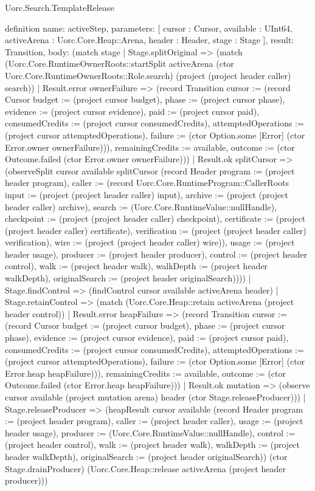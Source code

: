 \begin{lexlean}{Uorc.Search.TemplateRelease}
\begin{semanticmodule}
definition{
  name: activeStep,
  parameters: [
    cursor : Cursor,
    available : UInt64,
    activeArena : Uorc.Core.Heap::Arena,
    header : Header,
    stage : Stage
  ],
  result: Transition,
  body: (match stage
    | Stage.splitOriginal => (match (Uorc.Core.RuntimeOwnerRoots::startSplit activeArena (ctor Uorc.Core.RuntimeOwnerRoots::Role.search) (project (project header caller) search))
      | Result.error ownerFailure => (record Transition {cursor := (record Cursor {budget := (project cursor budget), phase := (project cursor phase), evidence := (project cursor evidence), paid := (project cursor paid), consumedCredits := (project cursor consumedCredits), attemptedOperations := (project cursor attemptedOperations), failure := (ctor Option.some [Error] (ctor Error.owner ownerFailure))}), remainingCredits := available, outcome := (ctor Outcome.failed (ctor Error.owner ownerFailure))})
      | Result.ok splitCursor => (observeSplit cursor available splitCursor (record Header {program := (project header program), caller := (record Uorc.Core.RuntimeProgram::CallerRoots {input := (project (project header caller) input), archive := (project (project header caller) archive), search := (Uorc.Core.RuntimeValue::nullHandle), checkpoint := (project (project header caller) checkpoint), certificate := (project (project header caller) certificate), verification := (project (project header caller) verification), wire := (project (project header caller) wire)}), usage := (project header usage), producer := (project header producer), control := (project header control), walk := (project header walk), walkDepth := (project header walkDepth), originalSearch := (project header originalSearch)})))
    | Stage.findControl => (findControl cursor available activeArena header)
    | Stage.retainControl => (match (Uorc.Core.Heap::retain activeArena (project header control))
      | Result.error heapFailure => (record Transition {cursor := (record Cursor {budget := (project cursor budget), phase := (project cursor phase), evidence := (project cursor evidence), paid := (project cursor paid), consumedCredits := (project cursor consumedCredits), attemptedOperations := (project cursor attemptedOperations), failure := (ctor Option.some [Error] (ctor Error.heap heapFailure))}), remainingCredits := available, outcome := (ctor Outcome.failed (ctor Error.heap heapFailure))})
      | Result.ok mutation => (observe cursor available (project mutation arena) header (ctor Stage.releaseProducer)))
    | Stage.releaseProducer => (heapResult cursor available (record Header {program := (project header program), caller := (project header caller), usage := (project header usage), producer := (Uorc.Core.RuntimeValue::nullHandle), control := (project header control), walk := (project header walk), walkDepth := (project header walkDepth), originalSearch := (project header originalSearch)}) (ctor Stage.drainProducer) (Uorc.Core.Heap::release activeArena (project header producer)))
}
\end{semanticmodule}
\end{lexlean}
